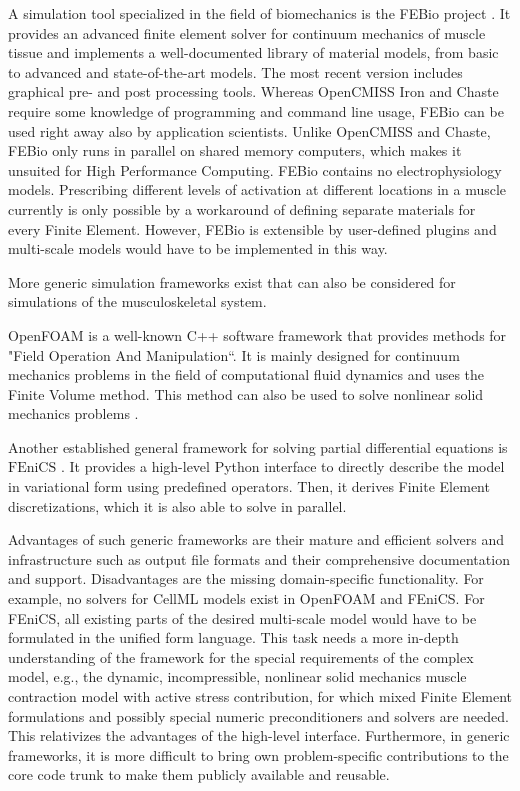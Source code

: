 A simulation tool specialized in the field of biomechanics is the FEBio project \cite{Maas2012,maas2017febio}. It provides an advanced finite element solver for continuum mechanics of muscle tissue and implements a well-documented library of material models, from basic to advanced and state-of-the-art models. The most recent version includes graphical pre- and post processing tools. Whereas OpenCMISS Iron and Chaste require some knowledge of programming and command line usage, FEBio can be used right away also by application scientists. 
Unlike OpenCMISS and Chaste, FEBio only runs in parallel on shared memory computers, which makes it unsuited for High Performance Computing. FEBio contains no electrophysiology models. Prescribing different levels of activation at different locations in a muscle currently is only possible by a workaround of defining separate materials for every Finite Element. However, FEBio is extensible by user-defined plugins and multi-scale models would have to be implemented in this way.

More generic simulation frameworks exist that can also be considered for simulations of the musculoskeletal system.

OpenFOAM \cite{jasak2007openfoam} is a well-known C++ software framework that provides methods for "Field Operation And Manipulation``. It is mainly designed for continuum mechanics problems in the field of computational fluid dynamics and uses the Finite Volume method. This method can also be used to solve nonlinear solid mechanics problems \cite{cardiff2014nonlinear}.

Another established general framework for solving partial differential equations is $\text{FEniCS}$ \cite{alnaes2015fenics}. It provides a high-level Python interface to directly describe the model in variational form using predefined operators. Then, it derives Finite Element discretizations, which it is also able to solve in parallel.

Advantages of such generic frameworks are their mature and efficient solvers and infrastructure such as output file formats and their comprehensive documentation and support. Disadvantages are the missing domain-specific functionality. For example, no solvers for CellML models exist in OpenFOAM and FEniCS. For FEniCS, all existing parts of the desired multi-scale model would have to be formulated in the unified form language. This task needs a more in-depth understanding of the framework for the special requirements of the complex model, e.g., the dynamic, incompressible, nonlinear solid mechanics muscle contraction model with active stress contribution, for which mixed Finite Element formulations and possibly special numeric preconditioners and solvers are needed. This relativizes the advantages of the high-level interface.
Furthermore, in generic frameworks, it is more difficult to bring own problem-specific contributions to the core code trunk to make them publicly available and reusable.

